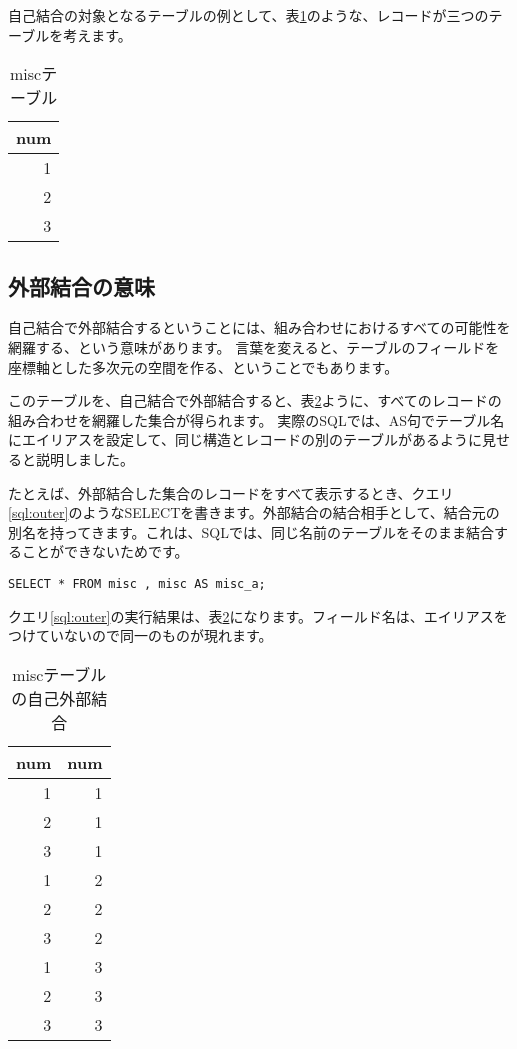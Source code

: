 自己結合の対象となるテーブルの例として、表\ref{table:misc}のような、レコードが三つのテーブルを考えます。

\begin{table}[htbp]
  \begin{tabular}{|r|} \hline
    num \\ \hline \hline  
    1 \\
    2 \\
    3 \\ \hline
  \end{tabular}
  \caption{miscテーブル}
  \label{table:misc}
\end{table}





\subsection{外部結合の意味}
自己結合で外部結合するということには、組み合わせにおけるすべての可能性を網羅する、という意味があります。
言葉を変えると、テーブルのフィールドを座標軸とした多次元の空間を作る、ということでもあります。



このテーブルを、自己結合で外部結合すると、表\ref{table:miscouter}ように、すべてのレコードの組み合わせを網羅した集合が得られます。
実際のSQLでは、AS句でテーブル名にエイリアスを設定して、同じ構造とレコードの別のテーブルがあるように見せると説明しました。

たとえば、外部結合した集合のレコードをすべて表示するとき、クエリ\ref{sql:outer}のようなSELECTを書きます。外部結合の結合相手として、結合元の別名を持ってきます。これは、SQLでは、同じ名前のテーブルをそのまま結合することができないためです。

\begin{lstlisting}[caption=自己結合の外部結合,label=sql:outer]
SELECT * FROM misc , misc AS misc_a;
\end{lstlisting}

クエリ\ref{sql:outer}の実行結果は、表\ref{table:miscouter}になります。フィールド名は、エイリアスをつけていないので同一のものが現れます。

\begin{table}[htbp]
  \begin{tabular}{|r|r|} \hline
    num & num \\ \hline \hline  
    1 & 1 \\
    2 & 1 \\
    3 & 1 \\ 
    1 & 2 \\
    2 & 2 \\
    3 & 2 \\
    1 & 3 \\
    2 & 3 \\
    3 & 3 \\ \hline
  \end{tabular}
  \caption{miscテーブルの自己外部結合}
  \label{table:miscouter}
\end{table}



